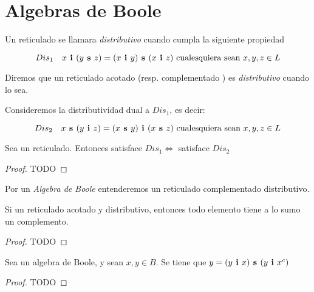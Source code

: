 
\section{Algebras de Boole}
\begin{definition}
  Un reticulado \reticulAlg se llamara \emph{distributivo} cuando cumpla la siguiente propiedad

  \begin{equation*}
    Dis_1\quad x\textbf{ i }(y\textbf{ s }z) = (x\textbf{ i }y)\textbf{ s }(x\textbf{ i }z) \text{ cualesquiera sean } x, y, z\in L
  \end{equation*}

  Diremos que un reticulado acotado \reticulAcot (resp. complementado \reticulCompl) es \emph{distributivo}
  cuando \reticulAlg lo sea.

  Consideremos la distributividad dual a $Dis_1$, es decir:

  \begin{equation*}
    Dis_2\quad x\textbf{ s }(y\textbf{ i }z) = (x\textbf{ s }y)\textbf{ i }(x\textbf{ s }z) \text{ cualesquiera sean } x, y, z\in L
  \end{equation*}
\end{definition}

\begin{lemma}
  Sea \reticulAlg un reticulado. Entonces \reticulAlg satisface $Dis_1 \iff$ \reticulAlg satisface $Dis_2$
\end{lemma}
\begin{proof}
  TODO
\end{proof}

\begin{definition}
  Por un \emph{Algebra de Boole} entenderemos un reticulado complementado distributivo.
\end{definition}

\begin{lemma}
  Si \reticulAcot un reticulado acotado y distributivo, entonces todo elemento tiene a lo sumo un complemento.
\end{lemma}
\begin{proof}
  TODO
\end{proof}

\begin{lemma}
  Sea \algBoole un algebra de Boole, y sean $x, y \in B$. Se tiene que $y = (y\textbf{ i }x)\textbf{ s }(y\textbf{ i }x^c)$
\end{lemma}
\begin{proof}
  TODO
\end{proof}

